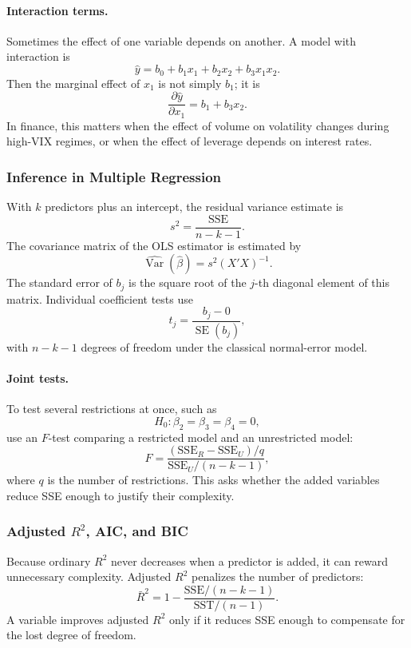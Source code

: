 \documentclass[12pt,openany]{book}
\begin{document}
\paragraph{Interaction terms.}
Sometimes the effect of one variable depends on another. A model with interaction is
\[
\hat{y}=b_0+b_1x_1+b_2x_2+b_3x_1x_2.
\]
Then the marginal effect of \(x_1\) is not simply \(b_1\); it is
\[
\frac{\partial \hat{y}}{\partial x_1}=b_1+b_3x_2.
\]
In finance, this matters when the effect of volume on volatility changes during high-VIX regimes, or when the effect of leverage depends on interest rates.

\subsubsection{Inference in Multiple Regression}

With \(k\) predictors plus an intercept, the residual variance estimate is
\[
s^2=\frac{\text{SSE}}{n-k-1}.
\]
The covariance matrix of the OLS estimator is estimated by
\[
\widehat{\operatorname{Var}}(\hat{\beta})=s^2(X'X)^{-1}.
\]
The standard error of \(b_j\) is the square root of the \(j\)-th diagonal element of this matrix. Individual coefficient tests use
\[
t_j=\frac{b_j-0}{\operatorname{SE}(b_j)},
\]
with \(n-k-1\) degrees of freedom under the classical normal-error model.

\paragraph{Joint tests.}
To test several restrictions at once, such as
\[
H_0:\beta_2=\beta_3=\beta_4=0,
\]
use an \(F\)-test comparing a restricted model and an unrestricted model:
\[
F=\frac{(\text{SSE}_R-\text{SSE}_U)/q}{\text{SSE}_U/(n-k-1)},
\]
where \(q\) is the number of restrictions. This asks whether the added variables reduce SSE enough to justify their complexity.

\subsubsection{Adjusted \texorpdfstring{\(R^2\)}{R-squared}, AIC, and BIC}

Because ordinary \(R^2\) never decreases when a predictor is added, it can reward unnecessary complexity. Adjusted \(R^2\) penalizes the number of predictors:
\[
\bar{R}^2=1-\frac{\text{SSE}/(n-k-1)}{\text{SST}/(n-1)}.
\]
A variable improves adjusted \(R^2\) only if it reduces SSE enough to compensate for the lost degree of freedom.
\end{document}
